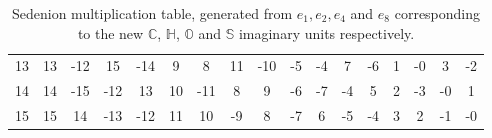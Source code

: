 \documentclass{article}
\newcommand{\bb}[1]{\mathbb{#1}}
\begin{document}
\begin{center}
\begin{table}[h!]
{\begin{tabular}{|c|| c c c c c c c c c c c c c c c c|}
 13 & 13  & -12 & 15 & -14 & 9 & 8 & 11 & -10 & -5 & -4 & 7 & -6 & 1 & -0 & 3 & -2\\ [1ex] 
 
 14 & 14 & -15 & -12 & 13 & 10 & -11 & 8 & 9 & -6 & -7 & -4 & 5 & 2 & -3 & -0 & 1\\ [1ex] 
 
 15 & 15 & 14 & -13 & -12 & 11 & 10 & -9 & 8 & -7 & 6 & -5 & -4 & 3 & 2 & -1 & -0\\ [1ex] 
 \hline

\end{tabular}
}
\caption{Sedenion multiplication table, generated from $e_1, e_2, e_4$ and $e_8$ corresponding to the new $\bb{C}$, $\bb{H}$, $\bb{O}$ and $\bb{S}$ imaginary units respectively.}
\end{table}
\end{center}






  
  
\end{document}
